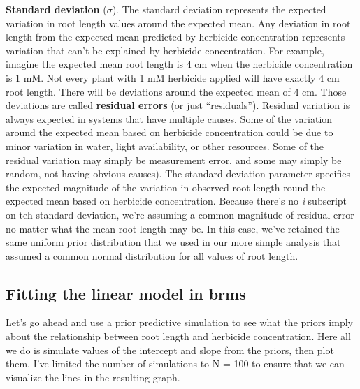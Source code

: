 \documentclass[
]{book}
\begin{document}
\begin{itemize}
\begin{itemize}
    \textbf{Standard deviation} (\(\sigma\)). The standard deviation represents the expected variation in root length values around the expected mean. Any deviation in root length from the expected mean predicted by herbicide concentration represents variation that can't be explained by herbicide concentration. For example, imagine the expected mean root length is 4 cm when the herbicide concentration is 1 mM. Not every plant with 1 mM herbicide applied will have exactly 4 cm root length. There will be deviations around the expected mean of 4 cm. Those deviations are called \textbf{residual errors} (or just ``residuals''). Residual variation is always expected in systems that have multiple causes. Some of the variation around the expected mean based on herbicide concentration could be due to minor variation in water, light availability, or other resources. Some of the residual variation may simply be measurement error, and some may simply be random, not having obvious causes). The standard deviation parameter specifies the expected magnitude of the variation in observed root length round the expected mean based on herbicide concentration. Because there's no \emph{i} subscript on teh standard deviation, we're assuming a common magnitude of residual error no matter what the mean root length may be. In this case, we've retained the same uniform prior distribution that we used in our more simple analysis that assumed a common normal distribution for all values of root length.
  \end{itemize}
\end{itemize}

\subsection{Fitting the linear model in brms}\label{fitting-the-linear-model-in-brms}

Let's go ahead and use a prior predictive simulation to see what the priors imply about the relationship between root length and herbicide concentration. Here all we do is simulate values of the intercept and slope from the priors, then plot them. I've limited the number of simulations to N = 100 to ensure that we can visualize the lines in the resulting graph.
\end{document}
